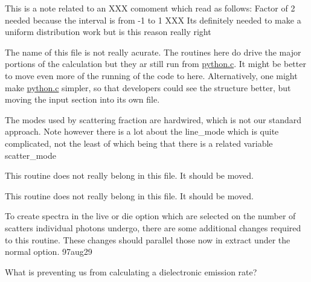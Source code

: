 \begin{DoxyRefList}
This is a note related to an X\+XX comoment which read as follows\+: Factor of 2 needed because the interval is from -\/1 to 1 X\+XX It\textquotesingle{}s definitely needed to make a uniform distribution work but is this reason really right 
\item[\label{bug__bug000052}%
\Hypertarget{bug__bug000052}%
File \hyperlink{run_8c}{run.c} ]The name of this file is not really acurate. The routines here do drive the major portions of the calculation but they ar still run from \hyperlink{python_8c}{python.\+c}. It might be better to move even more of the running of the code to here. Alternatively, one might make \hyperlink{python_8c}{python.\+c} simpler, so that developers could see the structure better, but moving the input section into it\textquotesingle{}s own file. 
\item[\label{bug__bug000037}%
\Hypertarget{bug__bug000037}%
Global \hyperlink{templates_8h_a4a12de5120dbfd2f67d3ac56645cb4e6}{scattering\+\_\+fraction} (struct lines $\ast$line\+\_\+ptr, Plasma\+Ptr xplasma)]The modes used by scattering fraction are hardwired, which is not our standard approach. Note however there is a lot about the line\+\_\+mode which is quite complicated, not the least of which being that there is a related variable scatter\+\_\+mode 
\item[\label{bug__bug000055}%
\Hypertarget{bug__bug000055}%
Global \hyperlink{templates_8h_ab0e6804f11862cb19cf6ac6976480c3f}{setup\+\_\+dfudge} (void)]This routine does not really belong in this file. It should be moved.  
\item[\label{bug__bug000055}%
\Hypertarget{bug__bug000055}%
Global \hyperlink{templates_8h_ab0e6804f11862cb19cf6ac6976480c3f}{setup\+\_\+dfudge} (void)]This routine does not really belong in this file. It should be moved.  
\item[\label{bug__bug000059}%
\Hypertarget{bug__bug000059}%
Global \hyperlink{templates_8h_a3e05df283bba500d0e7a307679b291d6}{spectrum\+\_\+create} (Phot\+Ptr p, double f1, double f2, int nangle, int select\+\_\+extract)]To create spectra in the live or die option which are selected on the number of scatters individual photons undergo, there are some additional changes required to this routine. These changes should parallel those now in extract under the normal option. 97aug29 
\item[\label{bug__bug000048}%
\Hypertarget{bug__bug000048}%
Global \hyperlink{templates_8h_a9d0d69b33092d06a7174d71c3082d2a6}{total\+\_\+fb} (Wind\+Ptr one, double t, double f1, double f2, int fb\+\_\+choice, int mode)]What is preventing us from calculating a dielectronic emission rate? 

\end{DoxyRefList}
